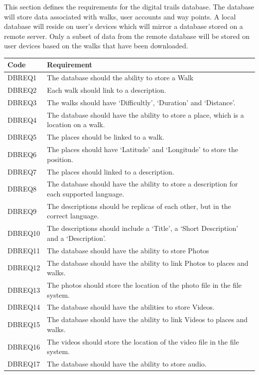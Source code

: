\documentclass[11pt,a4paper]{article}
\begin{document}
This section defines the requirements for the digital trails database.
The database will store data associated with walks, user accounts and way points.
A local database will reside on user's devices which will mirror a database stored on a remote server.
Only a subset of data from the remote database will be stored on user devices based on the walks that have been downloaded.

\begin{longtable}{|p{2.5cm}p{13cm}|}
\hline
\textbf{Code} & \textbf{Requirement} \\
\hline
DBREQ1 & The database should the ability to store a Walk\\ \hline
DBREQ2 & Each walk should link to a description.  \\ \hline
DBREQ3 & The walks should have `Difficultly', `Duration' and `Distance'. \\ \hline
DBREQ4 & The database should have the ability to store a place, which is a location on a walk.\\ \hline
DBREQ5 & The places should be linked to a walk.\\ \hline
DBREQ6 & The places should have `Latitude' and `Longitude' to store the position. \\ \hline
DBREQ7 & The places should linked to a description. \\ \hline
DBREQ8 & The database should have the ability to store a description for each supported language. \\ \hline
DBREQ9 & The descriptions should be replicas of each other, but in the correct language. \\ \hline
DBREQ10 & The descriptions should include a `Title', a `Short Description' and a `Description'.\\ \hline
DBREQ11 & The database should have the ability to store Photos \\ \hline
DBREQ12 & The database should have the ability to link Photos to places and walks.\\ \hline
DBREQ13 & The photos should store the location of the photo file in the file system.\\ \hline
DBREQ14 & The database should have the abilities to store Videos. \\ \hline
DBREQ15 & The database should have the ability to link Videos to places and walks.\\ \hline
DBREQ16 & The videos should store the location of the video file in the file system.\\ \hline
DBREQ17 & The database should have the ability to store audio. \\ \hline

\end{longtable}
\end{document}
